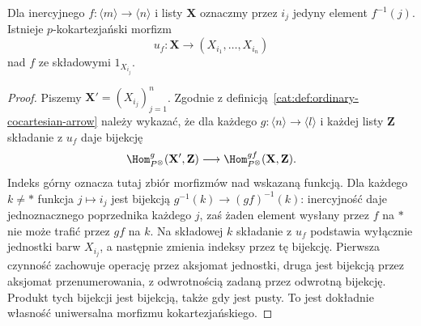 \begin{stwierdzenie}\label{cat:prop:infty-operator-inert}
Dla inercyjnego $f:\langle m\rangle\to\langle n\rangle$ i listy $\mathbf X$ oznaczmy przez $i_j$ jedyny element $f^{-1}(j)$. Istnieje $p$-kokartezjański morfizm
\[
 u_f:\mathbf X\longrightarrow (X_{i_1},\ldots,X_{i_n})
\]
nad $f$ ze składowymi $1_{X_{i_j}}$.
\end{stwierdzenie}
\begin{proof}
Piszemy $\mathbf X'=(X_{i_j})_{j=1}^n$. Zgodnie z definicją~\ref{cat:def:ordinary-cocartesian-arrow} należy wykazać, że dla każdego $g:\langle n\rangle\to\langle l\rangle$ i każdej listy $\mathbf Z$ składanie z $u_f$ daje bijekcję
\[
 \Hom^g_{P^\otimes}(\mathbf X',\mathbf Z)
 \longrightarrow \Hom^{gf}_{P^\otimes}(\mathbf X,\mathbf Z).
\]
Indeks górny oznacza tutaj zbiór morfizmów nad wskazaną funkcją. Dla każdego $k\neq *$ funkcja $j\mapsto i_j$ jest bijekcją $g^{-1}(k)\to(gf)^{-1}(k)$: inercyjność daje jednoznacznego poprzednika każdego $j$, zaś żaden element wysłany przez $f$ na $*$ nie może trafić przez $gf$ na $k$. Na składowej $k$ składanie z $u_f$ podstawia wyłącznie jednostki barw $X_{i_j}$, a następnie zmienia indeksy przez tę bijekcję. Pierwsza czynność zachowuje operację przez aksjomat jednostki, druga jest bijekcją przez aksjomat przenumerowania, z odwrotnością zadaną przez odwrotną bijekcję. Produkt tych bijekcji jest bijekcją, także gdy jest pusty. To jest dokładnie własność uniwersalna morfizmu kokartezjańskiego.
\end{proof}

